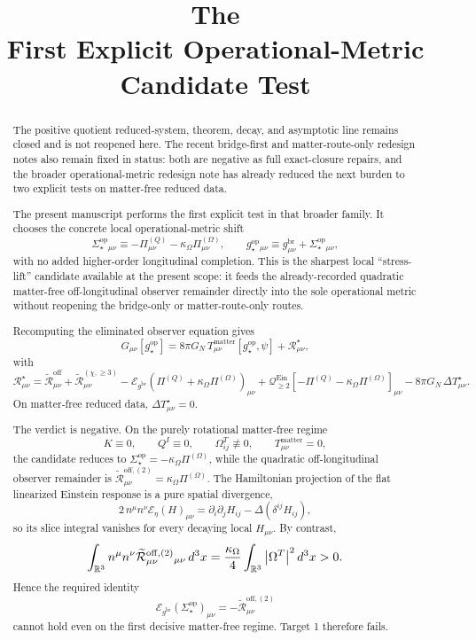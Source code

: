 \documentclass[11pt]{article}
\title{\textbf{The \TheoryName{}}\\[0.4em]
\large First Explicit Operational-Metric Candidate Test}
\author{}
\date{}
\newcommand{\ReBridge}{g^{\mathrm{br}}}
\newcommand{\OpMetricStar}{g^{\mathrm{op}}_\star}
\newcommand{\PiQ}{\Pi^{(Q)}}
\newcommand{\PiOmega}{\Pi^{(\Omega)}}
\newcommand{\SigmaOpStar}{\Sigma^{\mathrm{op}}_\star}
\newcommand{\ReOff}{\widetilde{\mathcal R}_{\mu\nu}^{\mathrm{off}}}
\newcommand{\ReOffTwo}{\widetilde{\mathcal R}_{\mu\nu}^{\mathrm{off},(2)}}
\newcommand{\ReLong}{\widetilde{\mathcal R}_{\mu\nu}^{(\chi,\ge 3)}}
\newcommand{\DeltaTStar}{\Delta T_{\mu\nu}^{\star}}
\newcommand{\EinLin}{\mathcal E_{\ReBridge}}
\newcommand{\EinLinFlat}{\mathcal E_{\eta}}
\newcommand{\EinQuad}{\mathcal Q_{\ge 2}^{\mathrm{Ein}}}
\begin{document}
\maketitle

\begin{abstract}
The positive quotient reduced-system, theorem, decay, and asymptotic line remains closed and is not reopened here. The recent bridge-first and matter-route-only redesign notes also remain fixed in status: both are negative as full exact-closure repairs, and the broader operational-metric redesign note has already reduced the next burden to two explicit tests on matter-free reduced data.

The present manuscript performs the first explicit test in that broader family. It chooses the concrete local operational-metric shift
\[
\SigmaOpStar{}_{\mu\nu}
\equiv
-\PiQ_{\mu\nu}-\kappa_\Omega\PiOmega_{\mu\nu},
\qquad
\OpMetricStar{}_{\mu\nu}
\equiv
\ReBridge_{\mu\nu}+\SigmaOpStar{}_{\mu\nu},
\]
with no added higher-order longitudinal completion. This is the sharpest local ``stress-lift'' candidate available at the present scope: it feeds the already-recorded quadratic matter-free off-longitudinal observer remainder directly into the sole operational metric without reopening the bridge-only or matter-route-only routes.

Recomputing the eliminated observer equation gives
\[
G_{\mu\nu}[\OpMetricStar]
=
8\pi G_N\,T_{\mu\nu}^{\mathrm{matter}}[\OpMetricStar,\psi]
+\mathcal R_{\mu\nu}^{\star},
\]
with
\[
\mathcal R_{\mu\nu}^{\star}
=
\ReOff+\ReLong
-\EinLin(\PiQ+\kappa_\Omega\PiOmega)_{\mu\nu}
+\EinQuad[-\PiQ-\kappa_\Omega\PiOmega]_{\mu\nu}
-8\pi G_N\,\DeltaTStar.
\]
On matter-free reduced data, \(\DeltaTStar=0\).

The verdict is negative. On the purely rotational matter-free regime
\[
K\equiv 0,
\qquad
Q^I\equiv 0,
\qquad
\Omega_{ij}^T\not\equiv 0,
\qquad
T_{\mu\nu}^{\mathrm{matter}}=0,
\]
the candidate reduces to \(\SigmaOpStar=-\kappa_\Omega\PiOmega\), while the quadratic off-longitudinal observer remainder is \(\ReOffTwo=\kappa_\Omega\PiOmega\). The Hamiltonian projection of the flat linearized Einstein response is a pure spatial divergence,
\[
2\,n^\mu n^\nu\EinLinFlat(H)_{\mu\nu}
=
\partial_i\partial_j H_{ij}
-\Delta(\delta^{ij}H_{ij}),
\]
so its slice integral vanishes for every decaying local \(H_{\mu\nu}\). By contrast,
\[
\int_{\mathbb R^3}
n^\mu n^\nu\ReOffTwo{}_{\mu\nu}\,d^3x
=
\frac{\kappa_\Omega}{4}
\int_{\mathbb R^3}\abs{\Omega^T}^2\,d^3x
>0.
\]
Hence the required identity
\[
\EinLin(\SigmaOpStar)_{\mu\nu}
=
-\ReOffTwo
\]
cannot hold even on the first decisive matter-free regime. Target 1 therefore fails.


\end{abstract}
\end{document}
